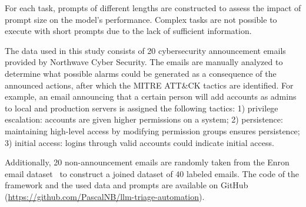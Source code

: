 For each task, prompts of different lengths are constructed to assess the impact of prompt size on the model's
performance.
Complex tasks are not possible to execute with short prompts due to the lack of sufficient information.

The data used in this study consists of 20 cybersecurity announcement emails provided by Northwave Cyber Security.
The emails are manually analyzed to determine what possible alarms could be generated as a consequence of the announced
actions, after which the MITRE ATT\&CK tactics are identified.
For example, an email announcing that a certain person will add accounts as admins to local and production servers is
assigned the following tactics: 1) privilege escalation: accounts are given higher permissions on a system;
2) persistence: maintaining high-level access by modifying permission groups ensures persistence;
3) initial access: logins through valid accounts could indicate initial access.

Additionally, 20 non-announcement emails are randomly taken from the Enron email dataset\ \citep{enron} to construct a
joined dataset of 40 labeled emails.
The code of the framework and the used data and prompts are available on
GitHub (\url{https://github.com/PascalNB/llm-triage-automation}).

